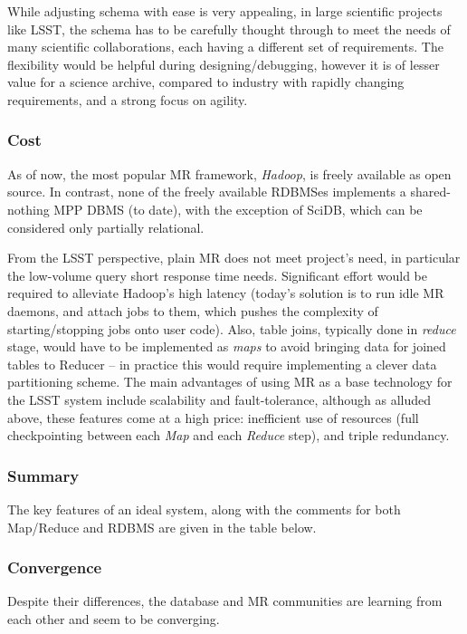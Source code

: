 \documentclass[DM,lsstdraft,toc]{lsstdoc}
\begin{document}
While adjusting schema with ease is very appealing, in large scientific
projects like LSST, the schema has to be carefully thought through to
meet the needs of many scientific collaborations, each having a
different set of requirements. The flexibility would be helpful during
designing/debugging, however it is of lesser value for a science
archive, compared to industry with rapidly changing requirements, and a
strong focus on agility.

\subsubsection{Cost}\label{cost}

As of now, the most popular MR framework, \emph{Hadoop}, is freely
available as open source. In contrast, none of the freely available
RDBMSes implements a shared-nothing MPP DBMS (to date), with the
exception of SciDB, which can be considered only partially relational.

From the LSST perspective, plain MR does not meet project's need, in
particular the low-volume query short response time needs. Significant
effort would be required to alleviate Hadoop's high latency (today's
solution is to run idle MR daemons, and attach jobs to them, which
pushes the complexity of starting/stopping jobs onto user code). Also,
table joins, typically done in \emph{reduce} stage, would have to be
implemented as \emph{maps} to avoid bringing data for joined tables to
Reducer -- in practice this would require implementing a clever data
partitioning scheme. The main advantages of using MR as a base
technology for the LSST system include scalability and fault-tolerance,
although as alluded above, these features come at a high price:
inefficient use of resources (full checkpointing between each \emph{Map}
and each \emph{Reduce} step), and triple redundancy.

\subsubsection{Summary}\label{summary}

The key features of an ideal system, along with the comments for both
Map/Reduce and RDBMS are given in the table below.

\subsubsection{Convergence}\label{convergence}

Despite their differences, the database and MR communities are learning
from each other and seem to be converging.
\end{document}
